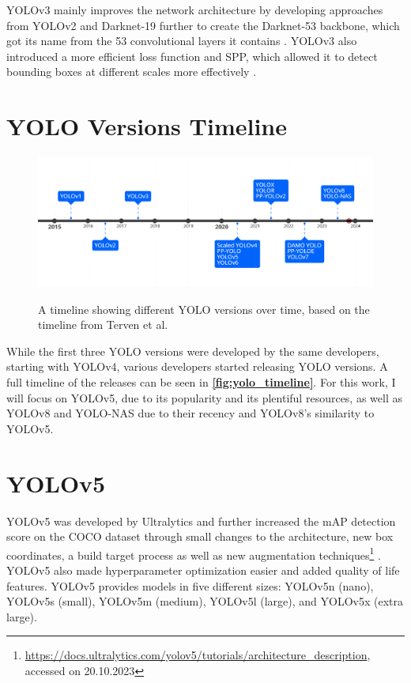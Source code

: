 \documentclass[10pt]{book}
\newcommand{\figureref}[1]{\textbf{\autoref{#1}}}
\begin{document}
\ac{YOLO}v3 mainly improves the network architecture by developing approaches from \ac{YOLO}v2 and Darknet-19 further to create the Darknet-53 backbone, which got its name from the 53 convolutional layers it contains \cite{redmon2018yolov3}. \ac{YOLO}v3 also introduced a more efficient loss function and \ac{SPP}, which allowed it to detect bounding boxes at different scales more effectively \cite{jani2023model}.

\section{YOLO Versions Timeline}

\begin{figure}
  \caption{A timeline showing different \ac{YOLO} versions over time, based on the timeline from Terven et al. \cite{terven2023comprehensive}}
  \includegraphics[width=\textwidth]{image/timeline_fix}
  \label{fig:yolo_timeline}
\end{figure}

While the first three \ac{YOLO} versions were developed by the same developers, starting with \ac{YOLO}v4, various developers started releasing \ac{YOLO} versions. A full timeline of the releases can be seen in \figureref{fig:yolo_timeline}. For this work, I will focus on \ac{YOLO}v5, due to its popularity and its plentiful resources, as well as \ac{YOLO}v8 and \ac{YOLO}-NAS due to their recency and \ac{YOLO}v8's similarity to \ac{YOLO}v5.

\section{YOLOv5}

\ac{YOLO}v5 was developed by Ultralytics and further increased the mAP detection score on the \ac{COCO} dataset through small changes to the architecture, new box coordinates, a build target process as well as new augmentation techniques\footnote{\url{https://docs.ultralytics.com/yolov5/tutorials/architecture_description}, accessed on 20.10.2023} \cite{gjocher2022yolov5,terven2023comprehensive}. \ac{YOLO}v5 also made hyperparameter optimization easier and added quality of life features. \ac{YOLO}v5 provides models in five different sizes: \ac{YOLO}v5n (nano), \ac{YOLO}v5s (small), \ac{YOLO}v5m (medium), \ac{YOLO}v5l (large), and \ac{YOLO}v5x (extra large).
\end{document}

